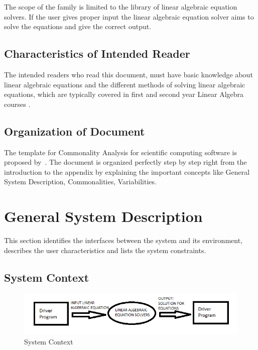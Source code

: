 \documentclass[12pt]{article}
\begin{document}
The scope of the family is limited to the library of linear algebraic equation
solvers. If the user gives proper input the linear algebraic equation solver
aims to solve the equations and give the correct output.

\subsection{Characteristics of Intended Reader} 

The intended readers who read this document, must have basic knowledge about
linear algebraic equations and the different methods of solving linear algebraic
equations, which are typically covered in first and second year Linear Algebra courses .


\subsection{Organization of Document}

The template for Commonality Analysis for scientific computing software is
proposed by~\cite{smith2006systematic}. The document is organized perfectly step
by step right from the introduction to the appendix by explaining the important
concepts like General System Description, Commonalities, Variabilities.

\section{General System Description}

This section identifies the interfaces between the system and its environment,
describes the user characteristics and lists the system constraints.

\subsection{System Context}

\begin{figure}[h]
\centering
\includegraphics[scale= .7]{diagram1}
\caption{System Context}
\end{figure}
\end{document}
